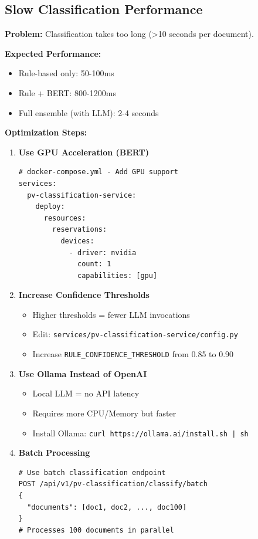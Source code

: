 \subsection{Slow Classification Performance}

\textbf{Problem:} Classification takes too long (>10 seconds per document).

\textbf{Expected Performance:}
\begin{itemize}
    \item Rule-based only: 50-100ms
    \item Rule + BERT: 800-1200ms
    \item Full ensemble (with LLM): 2-4 seconds
\end{itemize}

\textbf{Optimization Steps:}

\begin{enumerate}
    \item \textbf{Use GPU Acceleration (BERT)}
    \begin{lstlisting}[style=pythonstyle]
# docker-compose.yml - Add GPU support
services:
  pv-classification-service:
    deploy:
      resources:
        reservations:
          devices:
            - driver: nvidia
              count: 1
              capabilities: [gpu]
\end{lstlisting}

    \item \textbf{Increase Confidence Thresholds}
    \begin{itemize}
        \item Higher thresholds = fewer LLM invocations
        \item Edit: \texttt{services/pv-classification-service/config.py}
        \item Increase \texttt{RULE\_CONFIDENCE\_THRESHOLD} from 0.85 to 0.90
    \end{itemize}

    \item \textbf{Use Ollama Instead of OpenAI}
    \begin{itemize}
        \item Local LLM = no API latency
        \item Requires more CPU/Memory but faster
        \item Install Ollama: \texttt{curl https://ollama.ai/install.sh | sh}
    \end{itemize}

    \item \textbf{Batch Processing}
    \begin{lstlisting}[style=pythonstyle]
# Use batch classification endpoint
POST /api/v1/pv-classification/classify/batch
{
  "documents": [doc1, doc2, ..., doc100]
}
# Processes 100 documents in parallel
\end{lstlisting}


\end{enumerate}

